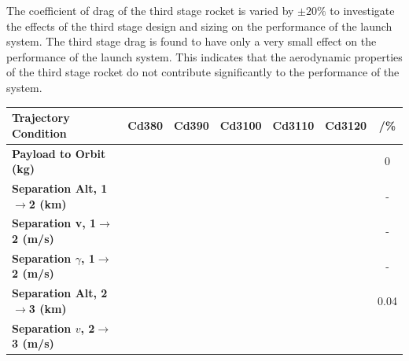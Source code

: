 The coefficient of drag of the third stage rocket is varied by $\pm20\%$ to investigate the effects of the third stage design and sizing on the performance of the launch system. The third stage drag is found to have only a very small effect on the performance of the launch system. This indicates that the aerodynamic properties of the third stage rocket do not contribute significantly to the performance of the system. 

\begin{table}[ht]
	\centering
\begin{tabular}{l c c c c c c} 
	\hline \textbf{Trajectory Condition}
	&Cd380
	&Cd390
	&Cd3100
	&Cd3110
	&Cd3120
	& /\%
	\\
	\hline \textbf{Payload to Orbit (kg)}
	& \PayloadToOrbitCdThreeEightyNoReturn
	& \PayloadToOrbitCdThreeNinetyNoReturn
	& \PayloadToOrbitCdThreeStandardNoReturn
	& \PayloadToOrbitCdThreeOneHundredTenNoReturn
	& \PayloadToOrbitCdThreeOneHundredTwentyNoReturn
	&0
	\\
	\textbf{Separation Alt, 1$\rightarrow$2 (km)}
	& \firstsecondSeparationAltCdThreeEightyNoReturn
	& \firstsecondSeparationAltCdThreeNinetyNoReturn
	& \firstsecondSeparationAltCdThreeStandardNoReturn
	& \firstsecondSeparationAltCdThreeOneHundredTenNoReturn
	& \firstsecondSeparationAltCdThreeOneHundredTwentyNoReturn
	& -
	\\
	\textbf{Separation v, 1$\rightarrow$2 (m/s)}
	& \firstsecondSeparationvCdThreeEightyNoReturn
	& \firstsecondSeparationvCdThreeNinetyNoReturn
	& \firstsecondSeparationvCdThreeStandardNoReturn
	& \firstsecondSeparationvCdThreeOneHundredTenNoReturn
	& \firstsecondSeparationvCdThreeOneHundredTwentyNoReturn
	& -
	\\
	\textbf{Separation $\gamma$, 1$\rightarrow$2 (m/s)}
	& \firstsecondSeparationgammaCdThreeEightyNoReturn
	& \firstsecondSeparationgammaCdThreeNinetyNoReturn
	& \firstsecondSeparationgammaCdThreeStandardNoReturn
	& \firstsecondSeparationgammaCdThreeOneHundredTenNoReturn
	& \firstsecondSeparationgammaCdThreeOneHundredTwentyNoReturn
	& -
	\\
	\textbf{Separation Alt, 2$\rightarrow$3 (km)}
	& \secondthirdSeparationAltCdThreeEightyNoReturn
	& \secondthirdSeparationAltCdThreeNinetyNoReturn
	& \secondthirdSeparationAltCdThreeStandardNoReturn
	& \secondthirdSeparationAltCdThreeOneHundredTenNoReturn
	& \secondthirdSeparationAltCdThreeOneHundredTwentyNoReturn
	&0.04
	\\
	\textbf{Separation $v$, 2$\rightarrow$3 (m/s)}
	& \secondthirdSeparationvCdThreeEightyNoReturn

\end{tabular}
\end{table}
